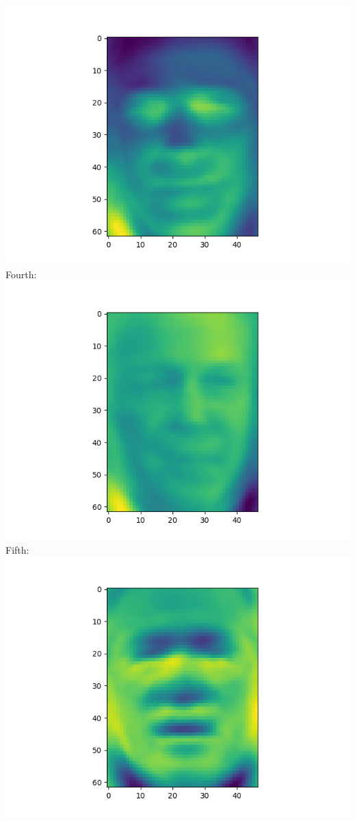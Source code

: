 \documentclass[twoside,10pt]{article}
\theoremstyle{definition}
\theoremstyle{definition}
\theoremstyle{remark}
\renewcommand{\>}{{\rightarrow}}
\newcommand{\1}{{\mathbf 1}}
\newcommand{\0}{{\mathbf 0}}
\begin{document}
\begin{enumerate}
  \includegraphics[width=\textwidth]{eigenface_3.png}
  Fourth:
  \includegraphics[width=\textwidth]{eigenface_4.png}
  Fifth:
  \includegraphics[width=\textwidth]{eigenface_5.png}

\end{enumerate}
\end{document}
